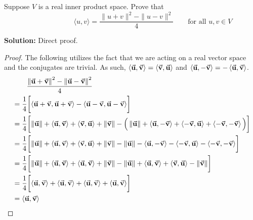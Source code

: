 Suppose $V$ is a real inner product space.  Prove that
    $$
        \hspace{1in} \langle u,v \rangle = \frac{\|u+v \|^2 - \|u-v \|^2}{4} \qquad \text{for all } u, v \in V
    $$
    \begin{mybox} \textbf{Solution:} Direct proof. 
        \begin{proof} The following utilizes the fact that we are acting on a real vector space and the conjugates are trivial. As such, $\inner{\bu, \bv} = \inner{\bv,\bu}$ and $\inner{\bu, -\bv} = -\inner{\bu,\bv}$.
            \begin{align*}
                &\qquad \dfrac{\norm{\bu+\bv}^2-\norm{\bu-\bv}^2}{4} \\
                &= \over{4} \Brac{ 
                    \inner{\bu + \bv, \bu + \bv}
                - 
                    \inner{\bu-\bv, \bu-\bv}
                }\\
                &= \over{4}\Brac{
                    \norm{\bu} + \inner{\bu,\bv} + \inner{\bv,\bu} + \norm{\bv} - \Big(\norm{\bu} + \inner{\bu,-\bv} + \inner{-\bv,\bu} + \inner{-\bv,-\bv}\Big)
                }\\
                &= \over{4}\Brac{
                    \norm{\bu} + \inner{\bu,\bv} + \inner{\bv,\bu} + \norm{\bv} - \norm{\bu} - \inner{\bu,-\bv} - \inner{-\bv,\bu} - \inner{-\bv,-\bv}
                }\\
                &= \over{4}\Brac{
                    \norm{\bu} + \inner{\bu,\bv} + \inner{\bu,\bv} + \norm{\bv} - \norm{\bu} + \inner{\bu,\bv} + \inner{\bv,\bu} - \norm{\bv}
                }\\
                &= \over{4}\Brac{
                    \inner{\bu,\bv} + \inner{\bu,\bv} + \inner{\bu,\bv} + \inner{\bu,\bv}
                }\\
                &= \inner{\bu,\bv}
            \end{align*}
        \end{proof}
        \end{mybox}